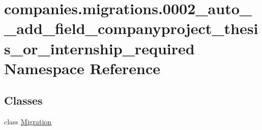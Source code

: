 \hypertarget{namespacecompanies_1_1migrations_1_10002__auto____add__field__companyproject__thesis__or__internship__required}{\section{companies.\-migrations.0002\-\_\-auto\-\_\-\-\_\-add\-\_\-field\-\_\-companyproject\-\_\-thesis\-\_\-or\-\_\-internship\-\_\-required Namespace Reference}
\label{namespacecompanies_1_1migrations_1_10002__auto____add__field__companyproject__thesis__or__internship__required}
}
\subsection*{Classes}
\begin{DoxyCompactItemize}
\item 
class \hyperlink{classcompanies_1_1migrations_1_10002__auto____add__field__companyproject__thesis__or__internship__required_1_1_migration}{Migration}
\end{DoxyCompactItemize}
